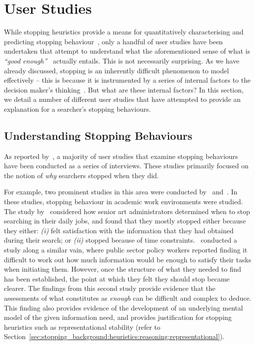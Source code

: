 \section{User Studies}\label{sec:stopping_background:user_studies}
While stopping heuristics provide a means for quantitatively characterising and predicting stopping behaviour~\citep{wu2014information_scent}, only a handful of user studies have been undertaken that attempt to understand what the aforementioned sense of what is \emph{``good enough''}~\citep{zach2005enough_is_enough} actually entails. This is not necessarily surprising. As we have already discussed, stopping is an inherently difficult phenomenon to model effectively -- this is because it is instrumented by a series of internal factors to the decision maker's thinking~\citep{nickles1995judgment}. But what are these internal factors? In this section, we detail a number of different user studies that have attempted to provide an explanation for a searcher's stopping behaviours.

\subsection{Understanding Stopping Behaviours}

As reported by~\cite{wu2014information_scent}, a majority of user studies that examine stopping behaviours have been conducted as a series of interviews. These studies primarily focused on the notion of \emph{why} searchers stopped when they did.

For example, two prominent studies in this area were conducted by~\cite{zach2005enough_is_enough} and~\cite{berryman2006defines}. In these studies, stopping behaviour in academic work environments were studied. The study by~\cite{zach2005enough_is_enough} considered how senior art administrators determined when to stop searching in their daily jobs, and found that they mostly stopped either because they either: \emph{(i)} felt satisfaction with the information that they had obtained during their search; or \emph{(ii)} stopped because of time constraints.~\cite{berryman2006defines} conducted a study along a similar vain, where public sector policy workers reported finding it difficult to work out how much information would be enough to satisfy their tasks when initiating them. However, once the structure of what they needed to find has been established, the point at which they felt they should stop became clearer. The findings from this second study provide evidence that the assessments of what constitutes as \emph{enough} can be difficult and complex to deduce. This finding also provides evidence of the development of an underlying mental model of the given information need, and provides justification for stopping heuristics such as representational stability (refer to Section~\ref{sec:stopping_background:heuristics:reasoning:representational}).

